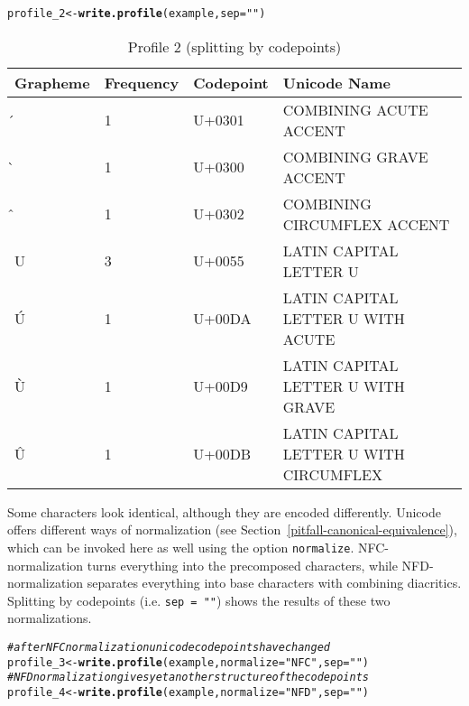\documentclass[output=inprep,
		biblatex
		]{LSP/langsci}\usepackage[]{graphicx}\usepackage[]{color}
\makeatletter
\newcommand{\hlstr}[1]{\textcolor[rgb]{0.192,0.494,0.8}{#1}}%
\newcommand{\hlcom}[1]{\textcolor[rgb]{0.678,0.584,0.686}{\textit{#1}}}%
\newcommand{\hlstd}[1]{\textcolor[rgb]{0.345,0.345,0.345}{#1}}%
\newcommand{\hlkwb}[1]{\textcolor[rgb]{0.69,0.353,0.396}{#1}}%
\newcommand{\hlkwc}[1]{\textcolor[rgb]{0.333,0.667,0.333}{#1}}%
\newcommand{\hlkwd}[1]{\textcolor[rgb]{0.737,0.353,0.396}{\textbf{#1}}}%
\newenvironment{kframe}{%
 \def\at@end@of@kframe{}%
 \ifinner\ifhmode%
  \def\at@end@of@kframe{\end{minipage}}%
  \begin{minipage}{\columnwidth}%
 \fi\fi%
 \def\FrameCommand##1{\hskip\@totalleftmargin \hskip-\fboxsep
 \colorbox{shadecolor}{##1}\hskip-\fboxsep
     \hskip-\linewidth \hskip-\@totalleftmargin \hskip\columnwidth}%
 \MakeFramed {\advance\hsize-\width
   \@totalleftmargin\z@ \linewidth\hsize
   \@setminipage}}%
 {\par\unskip\endMakeFramed%
 \at@end@of@kframe}
\newenvironment{knitrout}{}{} %
\makeatother
\begin{document}
\begin{knitrout}\footnotesize
{}\color{fgcolor}\begin{kframe}
\begin{alltt}
\hlstd{profile_2} \hlkwb{<-} \hlkwd{write.profile}\hlstd{(example,} \hlkwc{sep} \hlstd{=} \hlstr{""}\hlstd{)}
\end{alltt}
\end{kframe}
\end{knitrout}

\begin{table}[H]
\centering
\begingroup\scriptsize
\begin{tabular}{llll}
  \toprule
Grapheme & Frequency & Codepoint & Unicode Name \\ 
  \midrule
́ & 1 & U+0301 & COMBINING ACUTE ACCENT \\ 
  ̀ & 1 & U+0300 & COMBINING GRAVE ACCENT \\ 
  ̂ & 1 & U+0302 & COMBINING CIRCUMFLEX ACCENT \\ 
  U & 3 & U+0055 & LATIN CAPITAL LETTER U \\ 
  Ú & 1 & U+00DA & LATIN CAPITAL LETTER U WITH ACUTE \\ 
  Ù & 1 & U+00D9 & LATIN CAPITAL LETTER U WITH GRAVE \\ 
  Û & 1 & U+00DB & LATIN CAPITAL LETTER U WITH CIRCUMFLEX \\ 
   \bottomrule
\end{tabular}
\endgroup
\caption{Profile 2 (splitting by codepoints)} 
\label{tab:profile2}
\end{table}


Some characters look identical, although they are encoded differently.
Unicode offers different ways of normalization (see
Section~\ref{pitfall-canonical-equivalence}), which can be invoked here as well
using the option \texttt{normalize}. NFC-normalization turns everything into the
precomposed characters, while NFD-normalization separates everything into base
characters with combining diacritics. Splitting by codepoints (i.e. \texttt{sep~=~""}) shows the results of these two normalizations.

\begin{knitrout}\footnotesize
{}\color{fgcolor}\begin{kframe}
\begin{alltt}
\hlcom{# after NFC normalization unicode codepoints have changed}
\hlstd{profile_3} \hlkwb{<-} \hlkwd{write.profile}\hlstd{(example,} \hlkwc{normalize} \hlstd{=} \hlstr{"NFC"}\hlstd{,} \hlkwc{sep} \hlstd{=} \hlstr{""}\hlstd{)}
\hlcom{# NFD normalization gives yet another structure of the codepoints}
\hlstd{profile_4} \hlkwb{<-} \hlkwd{write.profile}\hlstd{(example,} \hlkwc{normalize} \hlstd{=} \hlstr{"NFD"}\hlstd{,} \hlkwc{sep} \hlstd{=} \hlstr{""}\hlstd{)}
\end{alltt}
\end{kframe}
\end{knitrout}
\end{document}
